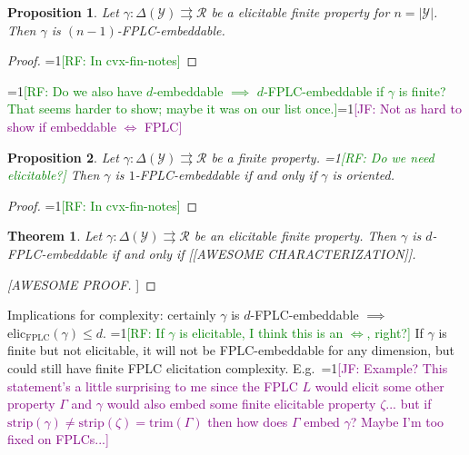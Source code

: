 \documentclass[11pt]{article}
\newcommand{\Comments}{1}
\newcommand{\mynote}[2]{\ifnum\Comments=1\textcolor{#1}{#2}\fi}
\newcommand{\raf}[1]{\mynote{green}{[RF: #1]}}
\newcommand{\jessie}[1]{\mynote{purple}{[JF: #1]}}
\newcommand{\R}{\mathcal{R}}
\newcommand{\Y}{\mathcal{Y}}
\newcommand{\toto}{\rightrightarrows}
\newcommand{\trim}{\mathrm{trim}}
\newcommand{\strip}{\mathrm{strip}}
\newcommand{\FPLC}{\mathrm{FPLC}}
\newcommand{\elic}{\mathrm{elic}}
\newtheorem{theorem}{Theorem}
\newtheorem{proposition}{Proposition}
\begin{document}
\begin{proposition}
  Let $\gamma:\Delta(\Y)\toto\R$ be a elicitable finite property for $n=|\Y|$.
  Then $\gamma$ is $(n-1)$-FPLC-embeddable.
\end{proposition}
\begin{proof}
  \raf{In cvx-fin-notes}  
\end{proof}

\raf{Do we also have $d$-embeddable $\implies$ $d$-FPLC-embeddable if $\gamma$ is finite?  That seems harder to show; maybe it was on our list once.}\jessie{Not as hard to show if embeddable $\iff$ FPLC}

\begin{proposition}
  Let $\gamma:\Delta(\Y)\toto\R$ be a finite property. \raf{Do we need elicitable?}
  Then $\gamma$ is $1$-FPLC-embeddable if and only if $\gamma$ is oriented.
\end{proposition}
\begin{proof}
  \raf{In cvx-fin-notes}
\end{proof}

\begin{theorem}
  Let $\gamma:\Delta(\Y)\toto\R$ be an elicitable finite property.
  Then $\gamma$ is $d$-FPLC-embeddable if and only if [[AWESOME CHARACTERIZATION]].
\end{theorem}
\begin{proof}
  [[AWESOME PROOF]]
\end{proof}

Implications for complexity: certainly $\gamma$ is $d$-FPLC-embeddable $\implies$ $\elic_\FPLC(\gamma) \leq d$.
\raf{If $\gamma$ is elicitable, I think this is an $\iff$, right?}
If $\gamma$ is finite but not elicitable, it will not be FPLC-embeddable for any dimension, but could still have finite FPLC elicitation complexity.
E.g.\ 
\jessie{Example?  This statement's a little surprising to me since the FPLC $L$ would elicit some other property $\Gamma$ and $\gamma$ would also embed some finite elicitable property $\zeta$... but if $\strip(\gamma) \neq \strip(\zeta) = \trim(\Gamma)$ then how does $\Gamma$ embed $\gamma$?  Maybe I'm too fixed on FPLCs...}
\end{document}
